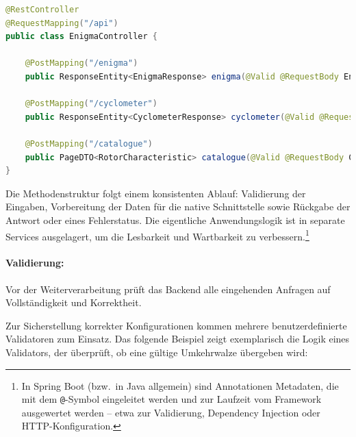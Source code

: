 \documentclass[12pt, ngerman, a4paper, numbers=noenddot]{article}
\begin{document}
\begin{lstlisting}[language=Java, caption={Ausschnitt aus dem EnigmaController}, label=lst:enigma-controller]
@RestController
@RequestMapping("/api")
public class EnigmaController {
	
	@PostMapping("/enigma")
	public ResponseEntity<EnigmaResponse> enigma(@Valid @RequestBody EnigmaRequest req) {...}
	
	@PostMapping("/cyclometer")
	public ResponseEntity<CyclometerResponse> cyclometer(@Valid @RequestBody ManualCyclometerRequest req) {...}
	
	@PostMapping("/catalogue")
	public PageDTO<RotorCharacteristic> catalogue(@Valid @RequestBody CatalogueRequest req) {...}
}
\end{lstlisting}

Die Methodenstruktur folgt einem konsistenten Ablauf: Validierung der Eingaben, Vorbereitung der Daten für die native Schnittstelle sowie Rückgabe der Antwort oder eines Fehlerstatus. Die eigentliche Anwendungslogik ist in separate Services ausgelagert, um die Lesbarkeit und Wartbarkeit zu verbessern.\footnote{%
	In Spring Boot (bzw.\ in Java allgemein) sind Annotationen Metadaten, die mit dem \lstinline|@|-Symbol eingeleitet werden und zur Laufzeit vom Framework ausgewertet werden – etwa zur Validierung, Dependency Injection oder HTTP-Konfiguration.%
}





\paragraph{Validierung:}

Vor der Weiterverarbeitung prüft das Backend alle eingehenden Anfragen auf Vollständigkeit und Korrektheit.

Zur Sicherstellung korrekter Konfigurationen kommen mehrere benutzerdefinierte Validatoren zum Einsatz. Das folgende Beispiel zeigt exemplarisch die Logik eines Validators, der überprüft, ob eine gültige Umkehrwalze übergeben wird:
\end{document}
